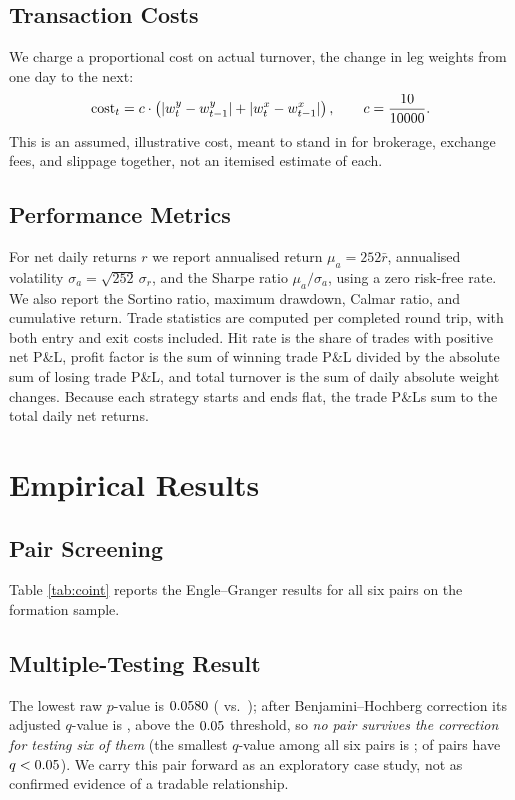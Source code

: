 \documentclass[11pt,a4paper]{article}
\begin{document}
\subsection{Transaction Costs}
We charge a proportional cost on actual turnover, the change in leg weights from one day to the next:
\begin{equation}
\text{cost}_t = c \cdot \left(|w^y_t-w^y_{t-1}| + |w^x_t-w^x_{t-1}|\right), \qquad c = \frac{10{}}{10000}.
\end{equation}
This is an assumed, illustrative cost, meant to stand in for brokerage, exchange fees, and slippage together, not an itemised estimate of each.

\subsection{Performance Metrics}
For net daily returns $r$ we report annualised return $\mu_a=252\bar r$, annualised volatility $\sigma_a=\sqrt{252}\,\sigma_r$, and the Sharpe ratio $\mu_a/\sigma_a$, using a zero risk-free rate. We also report the Sortino ratio, maximum drawdown, Calmar ratio, and cumulative return. Trade statistics are computed per completed round trip, with both entry and exit costs included. Hit rate is the share of trades with positive net P\&L, profit factor is the sum of winning trade P\&L divided by the absolute sum of losing trade P\&L, and total turnover is the sum of daily absolute weight changes. Because each strategy starts and ends flat, the trade P\&Ls sum to the total daily net returns.
\section{Empirical Results}\label{sec:results}

\subsection{Pair Screening}
Table \ref{tab:coint} reports the Engle--Granger results for all six pairs on the formation sample.

\begin{table}[H]
\centering
\caption{Engle--Granger cointegration tests, formation period}
\label{tab:coint}

\end{table}

\subsection{Multiple-Testing Result}\label{sec:bhres}
The lowest raw $p$-value is $0.0580{}$ (\PairY{} vs.\ \PairX{}); after Benjamini--Hochberg correction its adjusted $q$-value is \BestQ{}, above the $0.05{}$ threshold, so \emph{no pair survives the correction for testing six of them} (the smallest $q$-value among all six pairs is \MinQ{}; \NSurviveBH{} of \NPairs{} pairs have $q<0.05{}$). We carry this pair forward as an exploratory case study, not as confirmed evidence of a tradable relationship.
\end{document}
